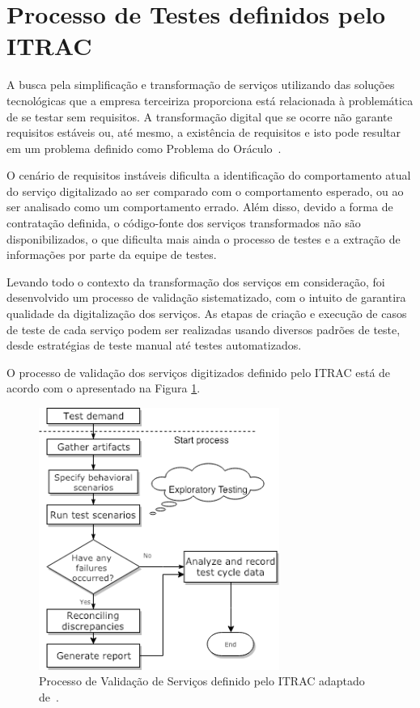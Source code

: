 \section{Processo de Testes definidos pelo ITRAC}

A busca pela simplificação  e transformação de serviços utilizando das soluções tecnológicas que a empresa terceiriza proporciona está relacionada à problemática de se testar sem requisitos. A transformação digital que se ocorre não garante requisitos estáveis ou, até mesmo, a existência de requisitos e isto pode resultar em um problema definido como Problema do Oráculo~\cite{barr2015oracle}. 

O cenário de requisitos instáveis dificulta a identificação do comportamento atual do serviço digitalizado ao ser comparado com o comportamento esperado, ou ao ser analisado como um comportamento errado.  Além disso, devido a forma de contratação definida, o código-fonte dos serviços transformados não são disponibilizados, o que dificulta mais ainda o processo de testes e a extração de informações por parte da equipe de testes.

Levando todo o contexto da transformação dos serviços em consideração, foi desenvolvido um processo de validação sistematizado, com o intuito de garantira qualidade da digitalização dos serviços. As etapas de criação e execução de casos de teste de cada serviço podem ser realizadas usando diversos padrões de teste, desde estratégias de teste manual até testes automatizados. 

O processo de validação dos serviços digitizados  definido pelo ITRAC está de acordo com o apresentado na Figura \ref{img:process_test}.
 
 \begin{figure}[H]
 \centering
\includegraphics[width=0.7\textwidth]{figuras/Processo_artigo_menor.png}
\caption{Processo de Validação de Serviços definido pelo ITRAC adaptado de~\cite{elcock2006testing}.}
\label{img:process_test}
\end{figure}

